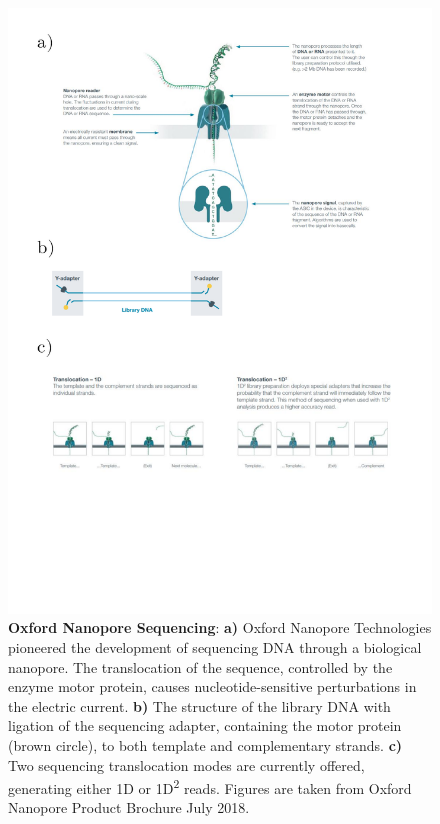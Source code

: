 \begin{figure}[]
	\centering
	\includegraphics[page=1,trim={0 6cm 0 0 },clip, scale = 0.8]{Figures/ProjectDevelopment_FiguresONT}
	\captionsetup{width=0.95\textwidth}
	\caption[Oxford Nanopore Sequencing]%
	{\textbf{Oxford Nanopore Sequencing}: \textbf{a)} Oxford Nanopore Technologies pioneered the development of sequencing DNA through a biological nanopore. The translocation of the sequence, controlled by the enzyme motor protein, causes nucleotide-sensitive perturbations in the electric current. \textbf{b)} The structure of the library DNA with ligation of the sequencing adapter, containing the motor protein (brown circle), to both template and complementary strands. \textbf{c)} Two sequencing translocation modes are currently offered, generating either 1D or 1D\textsuperscript{2} reads. Figures are taken from Oxford Nanopore Product Brochure July 2018.}
	\label{fig:ONT_Mechanism}
\end{figure}

